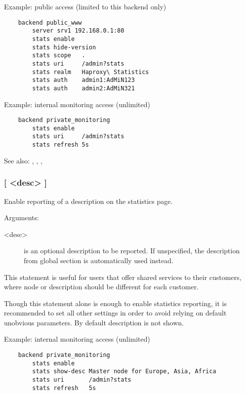 {  Example: public access (limited to this backend only)
  \begin{verbatim}
    backend public_www
        server srv1 192.168.0.1:80
        stats enable
        stats hide-version
        stats scope   .
        stats uri     /admin?stats
        stats realm   Haproxy\ Statistics
        stats auth    admin1:AdMiN123
        stats auth    admin2:AdMiN321
  \end{verbatim}

  Example: internal monitoring access (unlimited)
  \begin{verbatim}
    backend private_monitoring
        stats enable
        stats uri     /admin?stats
        stats refresh 5s
  \end{verbatim}

  See also: , , , 

\subsubsection[stats show-desc]{ [ <desc> ]}


  Enable reporting of a description on the statistics page.


   Arguments:
   \begin{description}
    \item[<desc>]    is an optional description to be reported. If unspecified, the
              description from global section is automatically used instead.
   \end{description}

  This statement is useful for users that offer shared services to their
  customers, where node or description should be different for each customer.

  Though this statement alone is enough to enable statistics reporting, it is
  recommended to set all other settings in order to avoid relying on default
  unobvious parameters.  By default description is not shown.

  Example: internal monitoring access (unlimited)
  \begin{verbatim}
    backend private_monitoring
        stats enable
        stats show-desc Master node for Europe, Asia, Africa
        stats uri       /admin?stats
        stats refresh   5s
  \end{verbatim}

}
